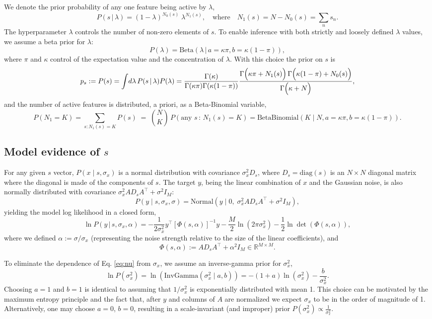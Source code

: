 \documentclass[letter,10pt,oneside]{article}
\newcommand{\bel}{\begin{equation}}
\newcommand{\eel}{\end{equation}}
\newcommand{\be}{\begin{equation*}}
\newcommand{\ee}{\end{equation*}}
\newcommand{\+}{^\dagger}
\newcommand{\T}{^\top}
\newcommand{\refeq}[1]{Eq. \ref{#1}}
\begin{document}
We denote the prior probability of any one feature being active by $\lambda$,
\be
  P(s\,|\,\lambda) = (1- \lambda)^{N_0(s)}\; \lambda^{N_1(s)}, \quad\text{where}\quad N_1(s) = N - N_0(s) = \sum_n s_n.
\ee
The hyperparameter $\lambda$ controls the number of non-zero elements of $s$. To enable inference with both strictly and loosely defined $\lambda$ values, we assume a beta prior for $\lambda$:
\be
  P(\lambda) = \text{Beta}(\lambda\,|\,a = \kappa \pi, b = \kappa (1-\pi)),
\ee
where $\pi$ and $\kappa$ control of the expectation value and the concentration of $\lambda$. With this choice the prior on $s$ is
\be
  p_s := P(s) = \intop\! d\lambda\, P(s\,|\,\lambda) P(\lambda) = \frac{\Gamma(\kappa)}{\Gamma(\kappa\pi)\Gamma(\kappa(1-\pi))} \frac{\Gamma\Big(\kappa \pi + N_1(s)\Big) \, \Gamma\Big(\kappa(1-\pi) + N_0(s)\Big)}{\Gamma\Big(\kappa + N\Big)},
\ee
and the number of active features is distributed, a priori, as a Beta-Binomial variable,
\be
  P(N_1 = K) = \sum_{s:N_1(s) = K} P(s) \;=\; {N \choose K} \,P(\text{any } s\,:\,N_1(s) = K) =  \text{BetaBinomial}(K\;|\; N, a = \kappa \pi, b = \kappa (1 - \pi)).
\ee


\subsection{Model evidence of $s$}
For any given $s$ vector, $P(x\;|\;s, \sigma_x)$ is a normal distribution with covariance $\sigma_x^2 D_s$, where $D_s = \text{diag}(s)$ is an $N\times N$ diagonal matrix where the diagonal is made of the components of $s$. The target $y$, being the linear combination of $x$ and the Gaussian noise, is also normally distributed with covariance $\sigma_x^2 A D_s A\T + \sigma^2 I_M$:
\be
  P(y\;|\;s, \sigma_x, \sigma) = \text{Normal}(y\;|\; 0, \;\sigma_x^2 A D_s A\T + \sigma^2 I_M),
\ee
yielding the model log likelihood in a closed form,
\bel
\label{eq:nu}
  \ln P(y\,|\,s, \sigma_x, \alpha) = -\frac{1}{2\sigma_x^2} y\T [\Phi(s, \alpha)]^{-1} y - \frac{M}{2}\ln(2\pi \sigma_x^2) - \frac{1}{2}\ln \det(\Phi(s,\alpha)),
\eel
where we defined $\alpha := \sigma / \sigma_x$ (representing the noise strength relative to the size of the linear coefficients), and
\be
  \Phi(s, \alpha) := A D_s A\T + \alpha^2 I_M \in \mathds{R}^{M\times M}.
\ee

To eliminate the dependence of \refeq{eq:nu} from $\sigma_x$, we assume an inverse-gamma prior for $\sigma_x^2$,
\be
  \ln P(\sigma_x^2) = \ln\left(\text{InvGamma}(\sigma_x^2\;|\;a, b)\right) = -(1 + a) \ln(\sigma_x^2) - \frac{b}{\sigma_x^2}.
\ee
Choosing $a = 1$ and $b = 1$ is identical to assuming that $1/\sigma_x^2$ is exponentially distributed with mean 1. This choice can be motivated by the maximum entropy principle and the fact that, after $y$ and columns of $A$ are normalized we expect $\sigma_x$ to be in the order of magnitude of 1. Alternatively, one may choose $a = 0$, $b = 0$, resulting in a scale-invariant (and improper) prior $P(\sigma_x^2) \propto \frac{1}{\sigma_x^2}$.
\end{document}
